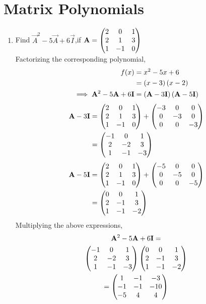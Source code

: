 \documentclass[journal,12pt,twocolumn]{IEEEtran}
\renewcommand\thesection{\arabic{section}}
\begin{document}
\section{Matrix Polynomials}
\renewcommand{\theequation}{\theenumi}
\begin{enumerate}[label=\thesection.\arabic*.,ref=\thesection.\theenumi]

\item Find $\vec{A}^{2}-5\vec{A}+6\vec{I}$,if $\mathbf{A} = \begin{pmatrix} 2 &0 &1\\2 &1 &3\\1 &-1 &0\end{pmatrix}$\\
\solution 
Factorizing the corresponding  polynomial, 
\begin{align}
  f(x) &= x^{2}-5x+6 
  \\
  &= \left(x-3\right)\left(x-2\right)
  \\
  \implies \mathbf{A}^{2}-5\mathbf{A}+6\mathbf{I} &= \left(\mathbf{A}-3\mathbf{I}\right)(\mathbf{A}-5\mathbf{I})
\end{align}
\begin{align}
  \mathbf{A}-3\mathbf{I}&=
\begin{pmatrix} 
	2& 0 &1 \\
	2 & 1 &3\\
	1 &-1 & 0
\end{pmatrix}
+
\begin{pmatrix} 
	-3& 0 &0\\
	0 & -3&0\\
	0 &0 & -3
\end{pmatrix}
\\
&= \begin{pmatrix} 
	-1 & 0 &1\\
	2 & -2&3\\
	1 &-1 &-3
\end{pmatrix}
\end{align}
\begin{align}
  \mathbf{A}-5\mathbf{I}&=
\begin{pmatrix} 
	2& 0 &1 \\
	2 & 1&3\\
	1 &-1 & 0
\end{pmatrix}
+
\begin{pmatrix} 
	-5& 0 &0\\
	0& -5 & 0\\
	0 &0 & -5
\end{pmatrix}
\\
&=\begin{pmatrix} 
	0& 0 &1\\
	2 & -1&3\\
	1 &-1 &-2
\end{pmatrix}
\end{align}
Multiplying the above expressions, 
\begin{multline}
  \mathbf{A}^{2}-5\mathbf{A}+6\mathbf{I}=
  \\
\begin{pmatrix} 
	-1 & 0 &1\\
	2 & -2&3\\
	1 &-1 &-3
\end{pmatrix}
\begin{pmatrix} 
	0& 0 &1\\
	2 & -1&3\\
	1 &-1 &-2
\end{pmatrix}
\\
= \begin{pmatrix} 
	1& -1&-3\\
	-1 & -1&-10\\
	-5 &4 &4
\end{pmatrix}
\end{multline}
%


\end{enumerate}
\end{document}
